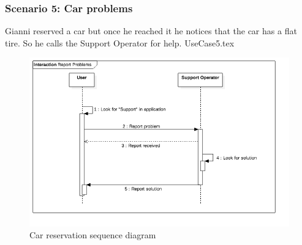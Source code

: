 \documentclass[12pt]{article}
\begin{document}
		\subsubsection{Scenario 5: Car problems}
		Gianni reserved a car but once he reached it he notices that the car has a flat
		tire. So he calls the Support Operator for help.
		\FloatBarrier
		{UseCase5.tex}
		\begin{figure}[htbp]
		 \caption{Car reservation sequence diagram}
		\includegraphics[scale=0.49]{Images/SequenceDiagram/Report.png}
 	 	\end{figure}
 	 	\clearpage
		
\end{document}
